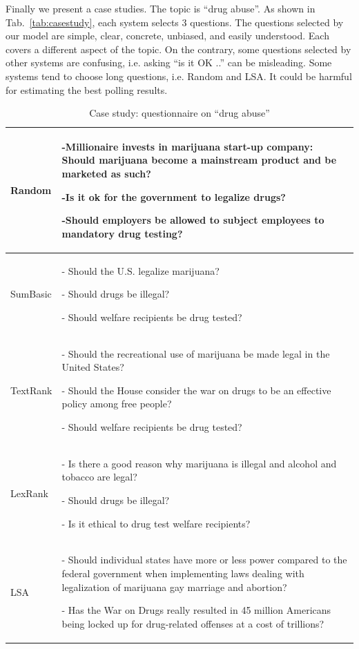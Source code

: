 \documentclass{llncs}
\begin{document}
Finally we present a case studies. The  topic is ``drug abuse''. As shown in Tab.~\ref{tab:casestudy}, each system selects 3 questions. The questions selected by our model are simple, clear, concrete, unbiased, and easily understood. Each covers a different aspect of the topic. On the contrary, some questions selected by other systems are confusing, i.e. asking ``is it OK ..'' can be misleading. Some systems tend to choose long questions, i.e. Random and LSA. It could be harmful for estimating the best polling results.
\begin{table}[htp]
\caption{Case study: questionnaire on ``drug abuse''}
\begin{center}
\small
\begin{tabular}{|p{2cm}|p{13cm}|}
\hline
Random &
 -Millionaire invests in marijuana start-up company: Should marijuana become a mainstream product and be marketed as such?
 
-Is it ok for the government to legalize drugs?
 
-Should employers be allowed to subject employees to mandatory drug testing?
\\\hline

SumBasic
&
- Should the U.S. legalize marijuana?

- Should drugs be illegal?

- Should welfare recipients be drug tested?
\\\hline

TextRank &

- Should the recreational use of marijuana be made legal in the United States?

- Should the House consider the war on drugs to be an effective policy among free people?

- Should welfare recipients be drug tested?
\\\hline

LexRank
&

- Is there a good reason why marijuana is illegal and alcohol and tobacco are legal?

- Should drugs be illegal?

- Is it ethical to drug test welfare recipients?
\\\hline

LSA
&

- Should individual states have more or less power compared to the federal government when implementing laws dealing with legalization of marijuana gay marriage and abortion?

- Has the War on Drugs really resulted in 45 million Americans being locked up for drug-related offenses at a cost of trillions?


\end{tabular}
\end{center}
\end{table}
\end{document}
